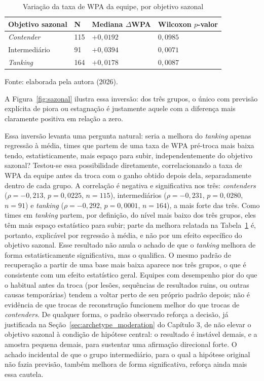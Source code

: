 \begin{table}[htb]
    \centering
    \caption{Variação da taxa de WPA da equipe, por objetivo sazonal}
    \label{tab:sazonal}
    \begin{tabular}{|p{2.6cm}|p{1.2cm}|p{2.4cm}|p{2.6cm}|}
    \hline
    \textbf{Objetivo sazonal} & \textbf{N} & \textbf{Mediana $\Delta$WPA} & \textbf{Wilcoxon $p$-valor} \\
    \hline
    \textit{Contender} & 115 & $+0{,}0192$ & $0{,}0985$ \\
    \hline
    Intermediário & 91 & $+0{,}0394$ & $0{,}0071$ \\
    \hline
    \textit{Tanking} & 164 & $+0{,}0178$ & $0{,}0087$ \\
    \hline
    \end{tabular}
    \begin{flushleft}
    \footnotesize Fonte: elaborada pela autora (2026).
    \end{flushleft}
\end{table}

A Figura~\ref{fig:sazonal} ilustra essa inversão: dos três grupos, o único com previsão explícita de piora ou estagnação é justamente aquele com a diferença mais claramente positiva em relação a zero.

Essa inversão levanta uma pergunta natural: seria a melhora do \textit{tanking} apenas regressão à média, times que partem de uma taxa de WPA pré-troca mais baixa tendo, estatisticamente, mais espaço para subir, independentemente do objetivo sazonal? Testou-se essa possibilidade diretamente, correlacionando a taxa de WPA da equipe antes da troca com o ganho obtido depois dela, separadamente dentro de cada grupo. A correlação é negativa e significativa nos três: \textit{contenders} ($\rho = -0{,}213$, $p = 0{,}0225$, $n = 115$), intermediários ($\rho = -0{,}231$, $p = 0{,}0280$, $n = 91$) e \textit{tanking} ($\rho = -0{,}292$, $p = 0{,}0001$, $n = 164$), a mais forte das três. Como times em \textit{tanking} partem, por definição, do nível mais baixo dos três grupos, eles têm mais espaço estatístico para subir; parte da melhora relatada na Tabela~\ref{tab:sazonal} é, portanto, explicável por regressão à média, e não por um efeito específico do objetivo sazonal. Esse resultado não anula o achado de que o \textit{tanking} melhora de forma estatisticamente significativa, mas o qualifica. O mesmo padrão de recuperação a partir de uma base mais baixa aparece nos três grupos, o que é consistente com um efeito estatístico geral. Equipes com desempenho pior do que o habitual antes da troca (por lesões, sequências de resultados ruins, ou outras causas temporárias) tendem a voltar perto de seu próprio padrão depois; não é evidência de que trocas de reconstrução funcionem melhor do que trocas de \textit{contenders}. De qualquer forma, o padrão observado reforça a decisão, já justificada na Seção~\ref{sec:archetype_moderation} do Capítulo 3, de não elevar o objetivo sazonal à condição de hipótese central: o resultado é instável demais, e a amostra pequena demais, para sustentar uma afirmação direcional forte. O achado incidental de que o grupo intermediário, para o qual a hipótese original não fazia previsão, também melhora de forma significativa, reforça ainda mais essa cautela.

